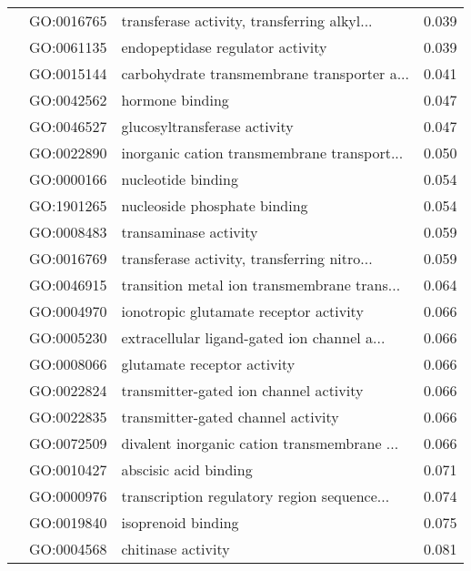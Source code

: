 \begin{longtable}{lllr}
   & GO:0016765 &  transferase activity, transferring alkyl... &         0.039 \\
   & GO:0061135 &             endopeptidase regulator activity &         0.039 \\
   & GO:0015144 &  carbohydrate transmembrane transporter a... &         0.041 \\
   & GO:0042562 &                              hormone binding &         0.047 \\
   & GO:0046527 &                 glucosyltransferase activity &         0.047 \\
   & GO:0022890 &  inorganic cation transmembrane transport... &         0.050 \\
   & GO:0000166 &                           nucleotide binding &         0.054 \\
   & GO:1901265 &                 nucleoside phosphate binding &         0.054 \\
   & GO:0008483 &                        transaminase activity &         0.059 \\
   & GO:0016769 &  transferase activity, transferring nitro... &         0.059 \\
   & GO:0046915 &  transition metal ion transmembrane trans... &         0.064 \\
   & GO:0004970 &       ionotropic glutamate receptor activity &         0.066 \\
   & GO:0005230 &  extracellular ligand-gated ion channel a... &         0.066 \\
   & GO:0008066 &                  glutamate receptor activity &         0.066 \\
   & GO:0022824 &       transmitter-gated ion channel activity &         0.066 \\
   & GO:0022835 &           transmitter-gated channel activity &         0.066 \\
   & GO:0072509 &  divalent inorganic cation transmembrane ... &         0.066 \\
   & GO:0010427 &                        abscisic acid binding &         0.071 \\
   & GO:0000976 &  transcription regulatory region sequence... &         0.074 \\
   & GO:0019840 &                           isoprenoid binding &         0.075 \\
   & GO:0004568 &                           chitinase activity &         0.081 \\
\end{longtable}
